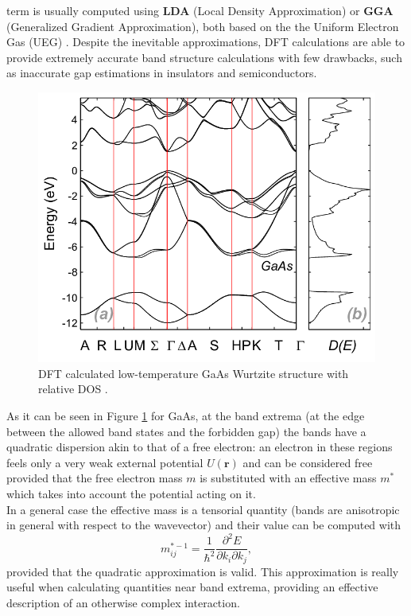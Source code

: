 term is usually computed using \textbf{LDA} (Local Density Approximation) or \textbf{GGA} (Generalized Gradient Approximation), both based on the the Uniform Electron 
Gas (UEG) \cite{ziesche1998density}.
Despite the inevitable approximations, DFT calculations are able to provide extremely accurate band structure calculations 
with few drawbacks, such as inaccurate gap estimations in insulators and semiconductors.
\begin{figure}[H]
    \centering
    \includegraphics[scale=0.4]{a-Calculated-low-temperature-band-structure-for-GaAs-in-WZ-phase-b-Calculated-DOS.png}
    \caption{DFT calculated low-temperature GaAs Wurtzite structure with relative DOS \cite{GaAs_wurtzite_structure}.}
    \label{fig:GaAs_Wurtzite_structure}
\end{figure}
As it can be seen in Figure \ref{fig:GaAs_Wurtzite_structure} for GaAs, at the band extrema (at the edge between the allowed band states 
and the forbidden gap) the bands have a quadratic dispersion akin to that of a free electron: an electron in these regions feels only a 
very weak external potential $U(\mathbf{r})$ and can be considered free provided that the free electron mass $m$ is substituted with an effective mass 
$m^*$ which takes into account the potential acting on it.\\
In a general case the effective mass is a tensorial quantity (bands are anisotropic in general with respect to the wavevector) and 
their value can be computed with
\begin{equation}
    m^{*-1}_{ij}=\frac{1}{\hbar^2}\frac{\partial^2 E}{\partial k_i \partial k_j},
    \label{eq_effective_mass}
\end{equation}
provided that the quadratic approximation is valid. This approximation is really useful when calculating quantities near band extrema, 
providing an effective description of an otherwise complex interaction.
